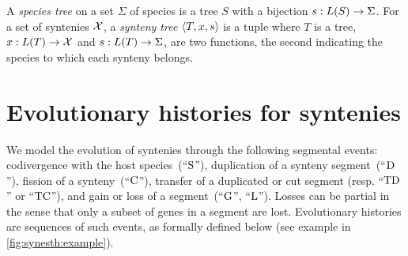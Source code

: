 A \emph{species tree} on a set \(\Sigma\) of species is a tree \(S\) with a bijection \(s : L(S) \rightarrow \Sigma\).
For a set of syntenies \(\mathcal{X}\), a \emph{synteny tree} \(\left\langle T, x, s\right\rangle\) is a tuple where \(T\) is a tree, \(x : L(T) \rightarrow \mathcal{X}\) and \(s : L(T) \rightarrow \Sigma\), are two functions, the second indicating the species to which each synteny belongs.

\section{Evolutionary histories for syntenies}\label{sec:synesth:def-model}

We model the evolution of syntenies through the following segmental events:
codivergence with the host species~(\enquote{\(\mathrm{S}\)}),
duplication of a synteny segment~(\enquote{\(\mathrm{D}\)}),
fission of a synteny~(\enquote{\(\mathrm{C}\)}),
transfer of a duplicated or cut segment (resp. \enquote{\(\mathrm{TD}\)} or \enquote{\(\mathrm{TC}\)}),
and gain or loss of a segment~(\enquote{\(\mathrm{G}\)}, \enquote{\(\mathrm{L}\)}).
Losses can be partial in the sense that only a subset of genes in a segment are lost.
Evolutionary histories are sequences of such events, as formally defined below (see example in \cref{fig:synesth:example}).

